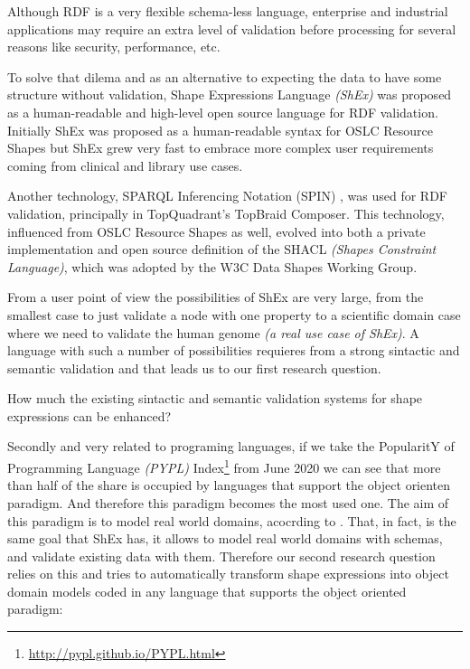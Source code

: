 Although RDF is a very flexible schema-less language, enterprise and industrial applications may require an extra level of
validation before processing for several reasons like security, performance, etc.

To solve that dilema and as an alternative to expecting the data to have some structure without validation, Shape Expressions Language
\textit{(ShEx)} was proposed as a human-readable and high-level open source language for RDF validation. Initially ShEx was proposed
as a human-readable syntax for OSLC Resource Shapes \cite{oslc-resource-shape} but ShEx grew very fast to embrace more
complex user requirements coming from clinical and library use cases.

Another technology, SPARQL Inferencing Notation (SPIN) \cite{knublauch2011spin}, was used for RDF validation, principally in TopQuadrant’s TopBraid Composer. This technology, influenced
from OSLC Resource Shapes as well, evolved into both a private implementation and open source definition of the SHACL
\textit{(Shapes Constraint Language)}, which was adopted by the W3C Data Shapes Working Group.

From a user point of view the possibilities of ShEx are very large, from the smallest case to just validate a node with one property
to a scientific domain case where we need to validate the human genome \textit{(a real use case of ShEx)}. A language with such a number
of possibilities requieres from a strong sintactic and semantic validation and that leads us to our first research question.

\begin{researchquestion}
  How much the existing sintactic and semantic validation systems for shape expressions can be enhanced?
\end{researchquestion}

Secondly and very related to programing languages, if we take the PopularitY of Programming Language \textit{(PYPL)} Index\footnote{\url{http://pypl.github.io/PYPL.html}}
from June 2020 we can see that more than half of the share is occupied by languages that support the object orienten paradigm. And therefore this paradigm
becomes the most used one. The aim of this paradigm is to model real world domains, acocrding to \cite{wegner1990concepts}. That, in fact, is the same goal
that ShEx has, it allows to model real world domains with schemas, and validate existing data with them. Therefore our second research question relies on this and tries
to automatically transform shape expressions into object domain models coded in any language that supports the object oriented paradigm:

